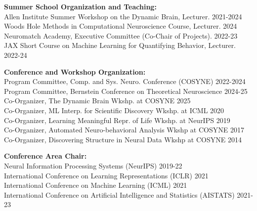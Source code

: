 \documentclass[10pt]{article}
\begin{document}
\begin{outerlist}

\item \textbf{Summer School Organization and Teaching:} \\
  Allen Institute Summer Workshop on the Dynamic Brain, Lecturer. \hfill{\small 2021-2024}\\
  Woods Hole Methods in Computational Neuroscience Course, Lecturer. \hfill{\small 2024}\\
  Neuromatch Academy, Executive Committee (Co-Chair of Projects). \hfill{\small 2022-23} \\
  JAX Short Course on Machine Learning for Quantifying Behavior, Lecturer. \hfill {\small 2022-24}\\
  
\item \textbf{Conference and Workshop Organization:} \\
  Program Committee, Comp. and Sys. Neuro. Conference (COSYNE) \hfill{\small 2022-2024} \\
  Program Committee, Bernstein Conference on Theoretical Neuroscience \hfill{\small 2024-25} \\
  Co-Organizer, The Dynamic Brain Wkshp. at COSYNE \hfill{\small 2025} \\
  Co-Organizer, ML Interp. for Scientific Discovery Wkshp. at ICML \hfill{\small 2020}\\
  Co-Organizer, Learning Meaningful Repr. of Life Wkshp. at NeurIPS \hfill{\small 2019}\\
  Co-Organizer, Automated Neuro-behavioral Analysis Wkshp at COSYNE \hfill{\small 2017}\\
  Co-Organizer, Discovering Structure in Neural Data Wkshp at COSYNE \hfill{\small 2014}

\item \textbf{Conference Area Chair:} \\
  Neural Information Processing Systems (NeurIPS) \hfill{\small 2019-22}\\
  International Conference on Learning Representations (ICLR) \hfill{\small 2021}\\
  International Conference on Machine Learning (ICML) \hfill{\small 2021}\\
  International Conference on Artificial Intelligence and Statistics (AISTATS) \hfill{\small 2021-23}
  

\end{outerlist}
\end{document}
